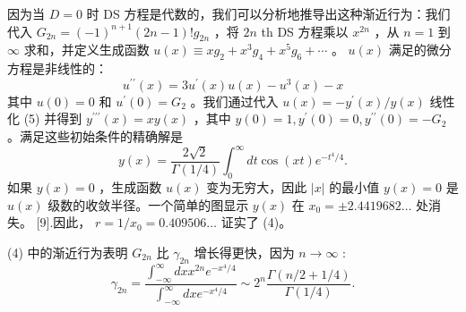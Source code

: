\documentclass[UTF8]{article}
\begin{document}
因为当 $D=0$ 时 DS 方程是代数的，我们可以分析地推导出这种渐近行为：我们代入 $G_{2 n}=(-1)^{n+1}(2 n-1) ! g_{2 n}$ ，将 $2 n$ th DS 方程乘以 $x^{2 n}$ ，从 $n=1$ 到 $\infty$ 求和，并定义生成函数 $u(x) \equiv x g_2+x^3 g_4+x^5 g_6+\cdots$ 。 $u(x)$ 满足的微分方程是非线性的： $$u^{\prime \prime}(x)=3 u^{\prime}(x) u(x)-u^3(x)-x
$$ 其中 $u(0)=0$ 和 $u^{\prime}(0)=G_2$ 。我们通过代入 $u(x)=-y^{\prime}(x) / y(x)$ 线性化 (5) 并得到 $y^{\prime \prime \prime}(x)=x y(x)$ ，其中 $y(0)=1, y^{\prime}(0)=0, y^{\prime \prime}(0)=-G_2$ 。满足这些初始条件的精确解是 $$y(x)=\frac{2 \sqrt{2}}{\Gamma(1 / 4)} \int_0^{\infty} d t \cos (x t) e^{-t^4 / 4} .
$$ 如果 $y(x)=0$ ，生成函数 $u(x)$ 变为无穷大，因此 $|x|$ 的最小值 $y(x)=0$ 是 $u(x)$ 级数的收敛半径。一个简单的图显示 $y(x)$ 在 $x_0= \pm 2.4419682 \ldots$ 处消失。 [9].因此， $r=1 / x_0=0.409506 \ldots$ 证实了 (4)。

(4) 中的渐近行为表明 $G_{2 n}$ 比 $\gamma_{2 n}$ 增长得更快，因为 $n \rightarrow \infty$ : $$
\gamma_{2 n}=\frac{\int_{-\infty}^{\infty} d x x^{2 n} e^{-x^4 / 4}}{\int_{-\infty}^{\infty} d x e^{-x^4 / 4}} \sim 2^n \frac{\Gamma(n / 2+1 / 4)}{\Gamma(1 / 4)} .
$$
\end{document}
